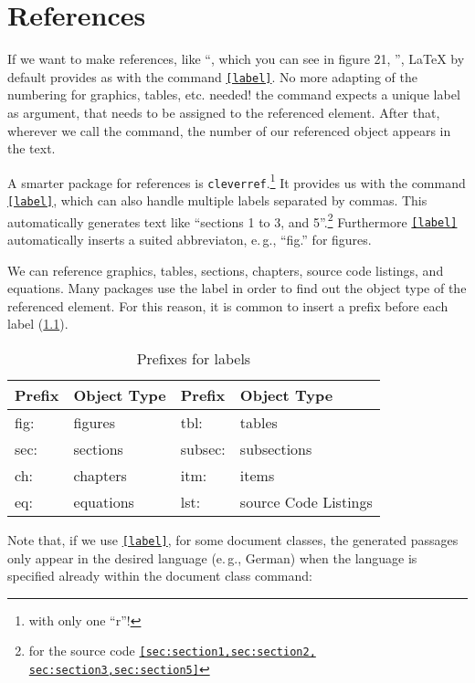 \chapter{References}
\label{sec:references}

If we want to make references, like \enquote{\textellipsis , which you can see in figure 21, \textellipsis}, \LaTeX{} by default provides as with the command \texttt{\ref{label}}. No more adapting of the numbering for graphics, tables, etc. needed!
the command expects a unique label as argument, that needs to be assigned to the referenced element. After that, wherever we call the command, the number of our referenced object appears in the text.

A smarter package for references is \texttt{cleverref}.\footnote{with only one \enquote{r}!}
It provides us with the command \texttt{\cref{label}}, which can also handle multiple labels separated by commas.
This automatically generates text like \enquote{sections 1 to 3, and 5}.\footnote{for the source code \texttt{\cref{sec:section1,sec:section2,
sec:section3,sec:section5}}}
Furthermore \texttt{\cref{label}} automatically inserts a suited abbreviaton, e.\,g., \enquote{fig.} for figures.

We can reference graphics, tables, sections, chapters, source code listings, and equations. 
Many packages use the label in order to find out the object type of the referenced element.
For this reason, it is common to insert a prefix before each label (\cref{lst:reference-prefixes}).

\begin{table}[H]
  \centering
  \begin{tabular}{@{}llll@{}}
    \toprule
    Prefix & Object Type & Prefix & Object Type \\ \midrule
    fig: & figures & tbl:    & tables            \\ 
    sec: & sections  & subsec: & subsections     \\
    ch:  & chapters     & itm:    & items \\
    eq:  & equations & lst:    & source Code Listings  \\ \bottomrule
  \end{tabular}
  \caption{Prefixes for labels}
  \label{lst:reference-prefixes}
\end{table}

Note that, if we use \texttt{\cref{label}}, for some document classes, the generated passages only appear in the desired language (e.\,g., German) when the language is specified already within the document class command:

